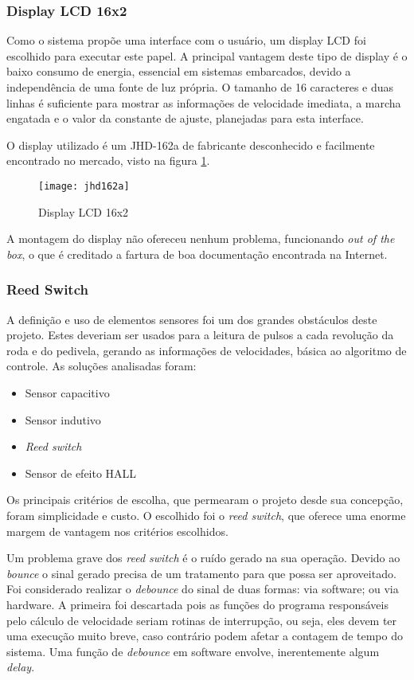 \documentclass[a4paper,11pt]{article}
\begin{document}
\subsubsection{Display LCD 16x2}
\label{sec:lcd}

Como o sistema propõe uma interface com o usuário, um display LCD foi escolhido
para executar este papel. A principal vantagem deste tipo de display é o baixo
consumo de energia, essencial em sistemas embarcados, devido a independência de
uma fonte de luz própria. O tamanho de 16 caracteres e duas linhas é suficiente
para mostrar as informações de velocidade imediata, a marcha engatada e o valor
da constante de ajuste, planejadas para esta interface.

O display utilizado é um JHD-162a\cite{lcd} de fabricante desconhecido e
facilmente encontrado no mercado, visto na figura \ref{fig:lcd}.
\begin{figure}[ht]
\begin{center}
 \texttt{[image: jhd162a]}
\end{center}
  \caption{Display LCD 16x2}
  \label{fig:lcd}
\end{figure}

A montagem do display não ofereceu nenhum problema, funcionando \textit{out of
the box}, o que é creditado a fartura de boa documentação encontrada na
Internet.

\subsubsection{Reed Switch}
\label{sec:reed}
A definição e uso de elementos sensores foi um dos grandes obstáculos deste
projeto. Estes deveriam ser usados para a leitura de pulsos a cada revolução da
roda e do pedivela, gerando as informações de velocidades, básica ao algoritmo
de controle. As soluções analisadas foram:
\begin{itemize}
 \item Sensor capacitivo
 \item Sensor indutivo
 \item \textit{Reed switch}
 \item Sensor de efeito HALL
\end{itemize}
Os principais critérios de escolha, que permearam o projeto desde sua concepção,
foram simplicidade e custo. O escolhido foi o  \textit{reed switch}, que
oferece uma enorme margem de vantagem nos critérios escolhidos.

Um problema grave dos \textit{reed switch} é o ruído gerado na
sua operação. Devido ao \textit{bounce}\cite{reed} o sinal gerado precisa de um
tratamento para que possa ser aproveitado. Foi considerado realizar o
\textit{debounce} do sinal de duas formas: via software; ou via hardware. A
primeira foi descartada pois as funções do programa responsáveis pelo
cálculo de velocidade seriam rotinas de interrupção, ou seja, eles devem ter uma
execução muito breve, caso contrário podem afetar a contagem de tempo do
sistema. Uma função de \textit{debounce} em software envolve, inerentemente
algum \textit{delay}.
\end{document}
